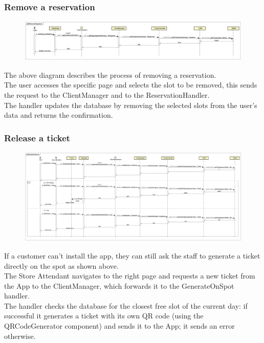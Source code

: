\documentclass[table, 12pt]{article}
\begin{document}
\subsubsection{Remove a reservation}
\begin{figure}[H]
    \begin{center}
        \includegraphics[width=\textwidth]{assets/Sequence-Diagram/RemoveSequence.png}
    \end{center}
\end{figure}
The above diagram describes the process of removing a reservation.\\
The user accesses the specific page and selects the slot to be removed, this sends the request to the ClientManager and to the ReservationHandler.\\
The handler updates the database by removing the selected slots from the user's data and returns the confirmation. \\
\subsubsection{Release a ticket}
\begin{figure}[H]
    \begin{center}
        \includegraphics[width=\textwidth]{assets/Sequence-Diagram/ReleaseSequence.png}
    \end{center}
\end{figure}
If a customer can't install the app, they can still ask the staff to generate a ticket directly on the spot as shown above.\\
The Store Attendant navigates to the right page and requests a new ticket from the App to the ClientManager, which forwards it to the GenerateOnSpot handler.\\
The handler checks the database for the closest free slot of the current day: if successful it generates a ticket with its own QR code (using the QRCodeGenerator component) and sends it to the App; it sends an error otherwise.\\
\end{document}

